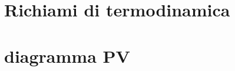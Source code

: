 \documentclass[a4paper, 15pt]{article}
\begin{document}
		
	
\section{Richiami di termodinamica}	
	

\newpage

\section{diagramma PV}
%
%
\end{document}
